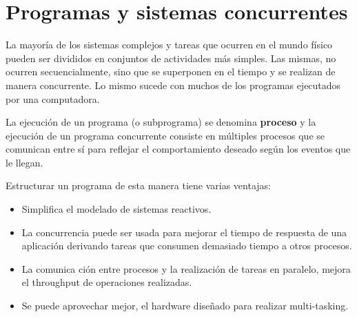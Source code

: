 \newpage
\section{Programas y sistemas concurrentes}
La mayoría de los sistemas complejos y tareas que ocurren en el mundo físico pueden ser divididos en conjuntos de actividades más simples. Las mismas, no ocurren secuencialmente, sino que se superponen en el tiempo y se realizan de manera concurrente. Lo mismo sucede con muchos de los programas ejecutados por una computadora.

La ejecución de un programa (o subprograma) se denomina \textbf{proceso} y la ejecución de un programa concurrente consiste en múltiples procesos que se comunican entre sí para reflejar el comportamiento deseado según los eventos que le llegan. 

Estructurar un programa de esta manera tiene varias ventajas:
\begin{itemize}
\item Simplifica el modelado de sistemas reactivos.
\item La concurrencia puede ser usada para mejorar el tiempo de respuesta de una aplicación derivando tareas que consumen demasiado tiempo a otros procesos.
\item La comunica
ción entre procesos y la realización de tareas en paralelo, mejora el throughput de operaciones realizadas.
\item Se puede aprovechar mejor, el hardware diseñado para realizar multi-tasking.
\end{itemize} 
